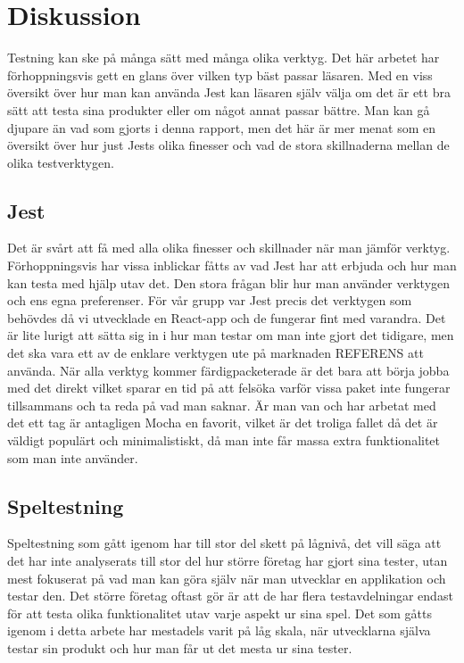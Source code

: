 \section{Diskussion}
\label{sec:david-discussion}
Testning kan ske på många sätt med många olika verktyg. Det här arbetet har förhoppningsvis gett en glans över vilken typ bäst passar läsaren. Med en viss översikt över hur man kan använda Jest kan läsaren själv välja om det är ett bra sätt att testa sina produkter eller om något annat passar bättre. Man kan gå djupare än vad som gjorts i denna rapport, men det här är mer menat som en översikt över hur just Jests olika finesser och vad de stora skillnaderna mellan de olika testverktygen.

\subsection{Jest} 
\label{subsec:david-discussion-jest}
Det är svårt att få med alla olika finesser och skillnader när man jämför verktyg. Förhoppningsvis har vissa inblickar fåtts av vad Jest har att erbjuda och hur man kan testa med hjälp utav det. Den stora frågan blir hur man använder verktygen och ens egna preferenser. För vår grupp var Jest precis det verktygen som behövdes då vi utvecklade en React-app och de fungerar fint med varandra. Det är lite lurigt att sätta sig in i hur man testar om man inte gjort det tidigare, men det ska vara ett av de enklare verktygen ute på marknaden REFERENS att använda. När alla verktyg kommer färdigpacketerade är det bara att börja jobba med det direkt vilket sparar en tid på att felsöka varför vissa paket inte fungerar tillsammans och ta reda på vad man saknar. Är man van och har arbetat med det ett tag är antagligen Mocha en favorit, vilket är det troliga fallet då det är väldigt populärt och minimalistiskt, då man inte får massa extra funktionalitet som man inte använder. 

\subsection{Speltestning}
\label{subsec:david-discussion-speltestning}
Speltestning som gått igenom har till stor del skett på lågnivå, det vill säga att det har inte analyserats till stor del hur större företag har gjort sina tester, utan mest fokuserat på vad man kan göra själv när man utvecklar en applikation och testar den. Det större företag oftast gör är att de har flera testavdelningar endast för att testa olika funktionalitet utav varje aspekt ur sina spel. Det som gåtts igenom i detta arbete har mestadels varit på låg skala, när utvecklarna själva testar sin produkt och hur man får ut det mesta ur sina tester. 